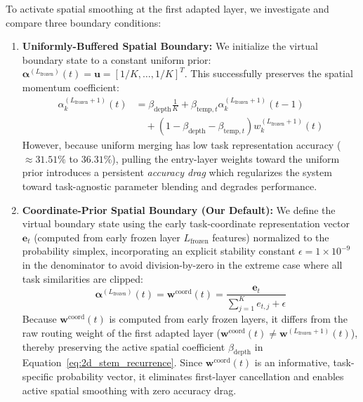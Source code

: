 To activate spatial smoothing at the first adapted layer, we investigate and compare three boundary conditions:
\begin{enumerate}
    \item \textbf{Uniformly-Buffered Spatial Boundary:} We initialize the virtual boundary state to a constant uniform prior: $\boldsymbol{\alpha}^{(L_{\text{frozen}})}(t) = \mathbf{u} = [1/K, \dots, 1/K]^T$. This successfully preserves the spatial momentum coefficient:
    \begin{align}
        \alpha_k^{(L_{\text{frozen}}+1)}(t) &= \beta_{\text{depth}} \frac{1}{K} + \beta_{\text{temp}, t} \alpha_k^{(L_{\text{frozen}}+1)}(t-1) \nonumber \\
        &\quad + \left(1 - \beta_{\text{depth}} - \beta_{\text{temp}, t}\right) w_k^{(L_{\text{frozen}}+1)}(t)
    \end{align}
    However, because uniform merging has low task representation accuracy ($\approx 31.51\%$ to $36.31\%$), pulling the entry-layer weights toward the uniform prior introduces a persistent \emph{accuracy drag} which regularizes the system toward task-agnostic parameter blending and degrades performance.
    
    \item \textbf{Coordinate-Prior Spatial Boundary (Our Default):} We define the virtual boundary state using the early task-coordinate representation vector $\mathbf{e}_t$ (computed from early frozen layer $L_{\text{frozen}}$ features) normalized to the probability simplex, incorporating an explicit stability constant $\epsilon = 1\times 10^{-9}$ in the denominator to avoid division-by-zero in the extreme case where all task similarities are clipped:
    \begin{equation}
        \boldsymbol{\alpha}^{(L_{\text{frozen}})}(t) = \mathbf{w}^{\text{coord}}(t) = \frac{\mathbf{e}_t}{\sum_{j=1}^K e_{t,j} + \epsilon}
    \end{equation}
    Because $\mathbf{w}^{\text{coord}}(t)$ is computed from early frozen layers, it differs from the raw routing weight of the first adapted layer ($\mathbf{w}^{\text{coord}}(t) \ne \mathbf{w}^{(L_{\text{frozen}}+1)}(t)$), thereby preserving the active spatial coefficient $\beta_{\text{depth}}$ in Equation~\ref{eq:2d_stem_recurrence}. Since $\mathbf{w}^{\text{coord}}(t)$ is an informative, task-specific probability vector, it eliminates first-layer cancellation and enables active spatial smoothing with zero accuracy drag.
\end{enumerate}


